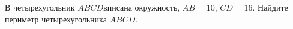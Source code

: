 \begin{ex}
	\begin{condition}
		В четырехугольник \(ABCD\)вписана окружность, \(AB=10\), \(CD=16\). Найдите периметр четырехугольника \(ABCD\).
	\end{condition}
\end{ex}